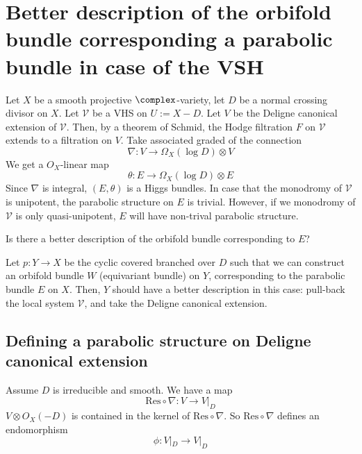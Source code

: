 \documentclass{article}
\begin{document}
\newcommand{\V}{\mathcal{V}}
\section{Better description of the orbifold bundle corresponding a parabolic bundle in case of 
the VSH}
Let $X$ be a smooth projective $\complex$-variety, let $D$ be a normal crossing divisor on $X$. 
Let $\V$ be a VHS on $U := X - D$. Let $V$ be the Deligne canonical extension of $\V$.
Then, by a theorem of Schmid, the Hodge filtration $F$ on $\V$ extends to a filtration on $V$.
Take associated graded of the connection
\[
    \nabla : V \rightarrow \Omega_X(\log D)\otimes V
\]
We get a $O_X$-linear map
\[
    \theta : E \rightarrow \Omega_X(\log D)\otimes E
\]
Since $\nabla$ is integral, $(E, \theta)$ is a Higgs bundles. 
In case that the monodromy of $\V$ is unipotent, the parabolic structure on $E$ is trivial.
However, if we monodromy of $\V$ is only quasi-unipotent, $E$ will have non-trival parabolic 
structure.  

\begin{question}
Is there a better description of the orbifold bundle corresponding to $E$?
\end{question}

Let $p: Y \rightarrow X$ be the cyclic covered branched over $D$ such that we can construct an
orbifold bundle $W$ (equivariant bundle) on $Y$, corresponding to the parabolic bundle $E$ on $X$.
Then, $Y$ should have a better description in this case: pull-back the local system $\V$, and take
the Deligne canonical extension.

\subsection{Defining a parabolic structure on Deligne canonical extension}
\newcommand{\Res}{\text{Res}}
Assume $D$ is irreducible and smooth. We have a map
\[
    \Res\circ\nabla : V \rightarrow V|_D
\]
$V\otimes O_X(-D)$ is contained in the kernel of $\Res\circ\nabla$. So $\Res\circ\nabla$ defines an
endomorphism
\[
    \phi: V|_D \rightarrow V|_D
\]
\end{document}
